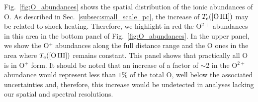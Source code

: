\documentclass[twocolumn]{aastex63}
\begin{document}
Fig.~\ref{fig:O_abundances} shows the spatial distribution of the ionic abundances of O. As described in Sec.~\ref{subsec:small_scale_pc}, the increase of $T_{\rm e}(\text{[O\thinspace III]})$ may be related to shock heating. Therefore, we highlight in red the O$^{2+}$ abundances in this area in the bottom panel of Fig.~\ref{fig:O_abundances}. In the upper panel, we show the O$^+$ abundances along the full distance range and the O ones in the area where $T_{\rm e}(\text{[O\thinspace III]})$ remains constant. This panel shows that practically all O is in O$^{+}$ form. It should be noted that an increase of a factor of $\sim$2 in the O$^{2+}$ abundance would represent  less than $1\%$ of the total O, well below the associated uncertainties and, therefore, this increase would be undetected in analyses lacking our spatial and spectral resolutions.
\end{document}
